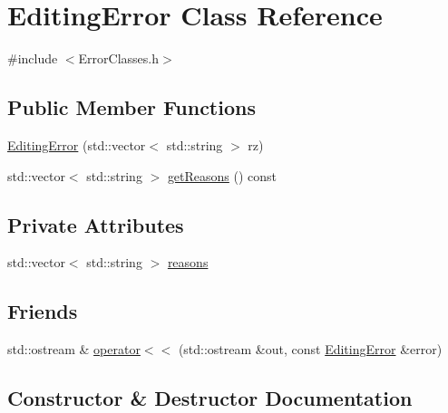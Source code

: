 \hypertarget{classEditingError}{}\section{Editing\+Error Class Reference}
\label{classEditingError}


{\ttfamily \#include $<$Error\+Classes.\+h$>$}

\subsection*{Public Member Functions}
\begin{DoxyCompactItemize}
\item 
\hyperlink{classEditingError_a2e157bb17c87fd86624c6ccd67d1bb3c}{Editing\+Error} (std\+::vector$<$ std\+::string $>$ rz)
\item 
std\+::vector$<$ std\+::string $>$ \hyperlink{classEditingError_a5e7c79a7580fb9a2865fdb9361400666}{get\+Reasons} () const 
\end{DoxyCompactItemize}
\subsection*{Private Attributes}
\begin{DoxyCompactItemize}
\item 
std\+::vector$<$ std\+::string $>$ \hyperlink{classEditingError_adfc8e5405eefb8478aeb36c465b356ad}{reasons}
\end{DoxyCompactItemize}
\subsection*{Friends}
\begin{DoxyCompactItemize}
\item 
std\+::ostream \& \hyperlink{classEditingError_a76ae0fa9ad6644e2bc43c1b7e413dac7}{operator$<$$<$} (std\+::ostream \&out, const \hyperlink{classEditingError}{Editing\+Error} \&error)
\end{DoxyCompactItemize}


\subsection{Constructor \& Destructor Documentation}

